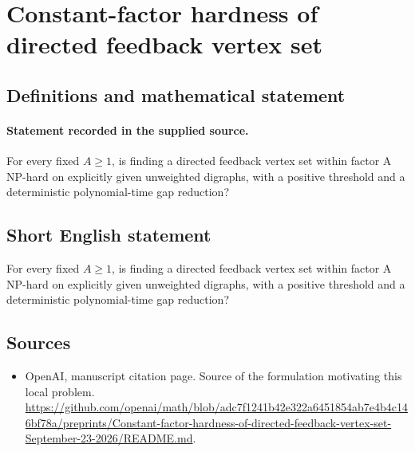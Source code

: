 \documentclass[11pt]{article}
\begin{document}
\section*{Constant-factor hardness of directed feedback vertex set}\label{statement}
\subsection{Definitions and mathematical statement}
\paragraph{Statement recorded in the supplied source.}
For every fixed $A\geq 1$, is finding a directed feedback vertex set within factor A NP-hard on explicitly given unweighted digraphs, with a positive threshold and a deterministic polynomial-time gap reduction?
\subsection{Short English statement}
For every fixed $A\geq 1$, is finding a directed feedback vertex set within factor A NP-hard on explicitly given unweighted digraphs, with a positive threshold and a deterministic polynomial-time gap reduction?
\subsection{Sources}
\begin{itemize}
\item[S1] OpenAI, manuscript citation page. Source of the formulation motivating this local problem.
\url{https://github.com/openai/math/blob/adc7f1241b42e322a6451854ab7e4b4c146bf78a/preprints/Constant-factor-hardness-of-directed-feedback-vertex-set-September-23-2026/README.md}.
\end{itemize}
\end{document}

